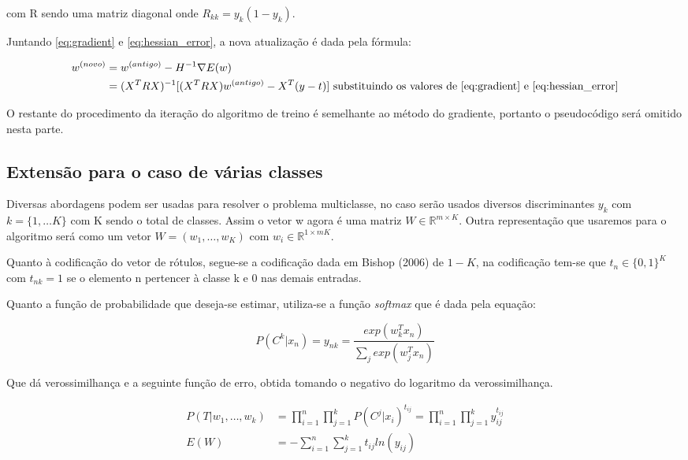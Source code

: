 com R sendo uma matriz diagonal onde $R_{kk} = y_k(1 - y_k)$.

Juntando \ref{eq:gradient} e \ref{eq:hessian_error}, a nova atualização é dada pela fórmula:


\begin{equation}
	\begin{split}
		w^{ (novo) } & = w^{ (antigo) } - H^{-1} \nabla E(w) \\
		& = (X^T R X)^{-1}[(X^T R X)w^{ (antigo) } - X^T(y - t)] \text{ substituindo os valores de \ref{eq:gradient} e \ref{eq:hessian_error}} 
	\end{split}
\end{equation}

O restante do procedimento da iteração do algoritmo de treino é semelhante ao método do gradiente,
portanto o pseudocódigo será omitido nesta parte.

\subsection{Extensão para o caso de várias classes}

Diversas abordagens podem ser usadas para resolver o problema multiclasse, no
caso serão usados diversos discriminantes $y_k$ com $k = \{1, \ldots K\}$ com K
sendo o total de classes. Assim o vetor w agora é uma matriz
$W \in \mathbb{R}^{m \times K}$. Outra representação que usaremos para o algoritmo
será como um vetor $W = (w_1, \ldots, w_K)$ com $w_i \in \mathbb{R}^{1 \times mK}$.

Quanto à codificação do vetor de rótulos, 
segue-se a codificação dada em Bishop (2006)\cite{bishop2006} de $1-K$,
na codificação tem-se que $t_n \in \{0, 1\}^K$ com $t_{nk} = 1$ se o elemento
n pertencer à classe k e 0 nas demais entradas. 

Quanto a função de probabilidade que deseja-se estimar, utiliza-se a função
\textit{softmax} que é dada pela equação:

\begin{center}
	\begin{equation}
		P(C^k | x_n) = y_{nk} = \frac{exp(w_k^Tx_n)}{\sum_j exp(w_j^Tx_n)} 
	\end{equation}
\end{center}

Que dá verossimilhança e a seguinte função de erro, obtida
tomando o negativo do logaritmo da verossimilhança.

\begin{center}
	\begin{align*}
				P(T | w_1, \ldots, w_k) &= \prod_{i = 1}^{n} \prod_{j = 1}^{k} P(C^j | x_i)^{t_{ij}} = \prod_{i = 1}^{n} \prod_{j = 1}^{k} y_{ij}^{t_{ij}} \\
		E(W) &= - \sum_{i = 1}^{n} \sum_{j = 1}^{k} t_{ij} ln(y_{ij})	
	\end{align*}
\end{center}

